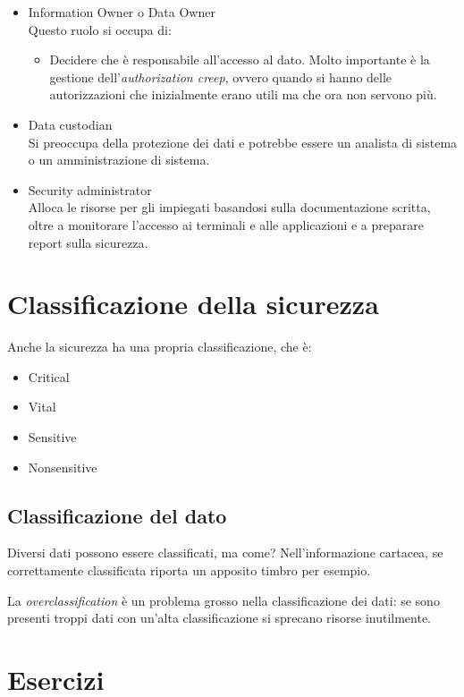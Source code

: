 \begin{itemize}
  \item Information Owner o Data Owner \\
  Questo ruolo si occupa di:
  \begin{itemize}
    \item Decidere che è responsabile all'accesso al dato. Molto importante è 
    la gestione dell'\textit{authorization creep}, ovvero quando si hanno delle 
    autorizzazioni che inizialmente erano utili ma che ora non servono più.
  \end{itemize}
  \item Data custodian \\
  Si preoccupa della protezione dei dati e potrebbe essere un analista di 
  sistema o un amministrazione di sistema.
  \item Security administrator \\
  Alloca le risorse per gli impiegati basandosi sulla documentazione scritta, 
  oltre a monitorare l'accesso ai terminali e alle applicazioni e a preparare 
  report sulla sicurezza.
\end{itemize}

\section{Classificazione della sicurezza}

Anche la sicurezza ha una propria classificazione, che è:
\begin{itemize}
  \item Critical
  \item Vital
  \item Sensitive
  \item Nonsensitive
\end{itemize}

\subsection{Classificazione del dato}

Diversi dati possono essere classificati, ma come?
Nell'informazione cartacea, se correttamente classificata riporta un 
apposito timbro per esempio.

La \textit{overclassification} è un problema grosso nella classificazione dei 
dati: se sono presenti troppi dati con un'alta classificazione si sprecano 
risorse inutilmente.

\section{Esercizi}

